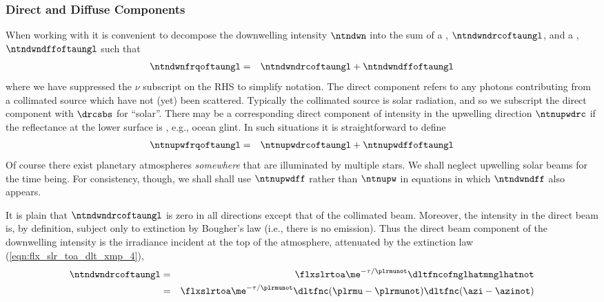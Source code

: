 \documentclass[12pt]{article}
\begin{document}
\subsubsection[Direct and Diffuse Components]{Direct and Diffuse
Components}\label{sxn:drc_dff}
When working with  it is convenient to
decompose  the downwelling intensity $\ntndwn$ into the sum of a
, $\ntndwndrcoftaungl$, and a , $\ntndwndffoftaungl$ such that 
\begin{eqnarray}
\ntndwnfrqoftaungl & = & \ntndwndrcoftaungl + \ntndwndffoftaungl
\label{eqn:ntn_frq_dwn_drc_dff}
\end{eqnarray}
where we have suppressed the $\nu$ subscript on the RHS to 
simplify notation.
The direct component refers to any photons contributing from a 
collimated source which have not (yet) been scattered.
Typically the collimated source is solar radiation, and so we
subscript the direct component with $\drcsbs$ for ``solar''.
There may be a corresponding direct component of intensity in the
upwelling direction $\ntnupwdrc$ if the reflectance at the lower
surface is , e.g., ocean glint. 
In such situations it is straightforward to define
\begin{eqnarray}
\ntnupwfrqoftaungl & = & \ntnupwdrcoftaungl + \ntnupwdffoftaungl
\label{eqn:ntn_frq_upw_drc_dff}
\end{eqnarray}
Of course there exist planetary atmospheres \textit{somewhere} that
are illuminated by multiple stars.
We shall neglect upwelling solar beams for the time being.
For consistency, though, we shall shall use $\ntnupwdff$ rather than
$\ntnupw$ in equations in which $\ntndwndff$ also appears.

It is plain that $\ntndwndrcoftaungl$ is zero in all directions except
that of the collimated beam.
Moreover, the intensity in the direct beam is, by definition, subject
only to extinction by Bougher's law (i.e., there is no emission).
Thus the direct beam component of the downwelling intensity is the 
irradiance incident at the top of the atmosphere, attenuated by the
extinction law (\ref{eqn:flx_slr_toa_dlt_xmp_4}),  
\begin{eqnarray}
\ntndwndrcoftaungl 
& = & 
\flxslrtoa \me^{-\tau/\plrmunot} \dltfncofnglhatmnglhatnot \\
& = & 
\flxslrtoa \me^{-\tau/\plrmunot} \dltfnc(\plrmu - \plrmunot) 
\dltfnc(\azi - \azinot) \nonumber
\label{eqn:ntn_dwn_drc_dfn}
\end{eqnarray}
\end{document}
